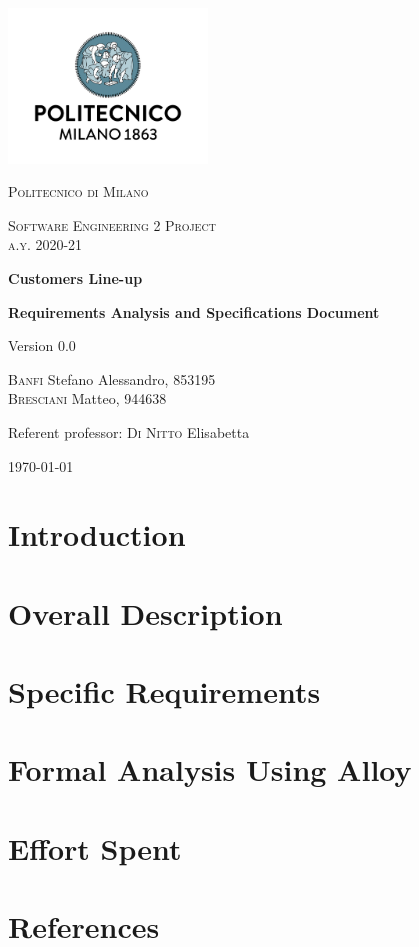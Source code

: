 \documentclass[fontsize=11pt,paper=a4,pagesize=auto]{report}
\begin{document}
\begin{titlepage}
	\centering
	\includegraphics[width=150pt]{images/polimi.jpg}\par\vspace{1cm}
	{\scshape\LARGE
		Politecnico di Milano\par}
	\vspace{1cm}
	{\scshape\Large
		Software Engineering 2 Project\\
		a.y. 2020-21\par}
	\vspace{1.5cm}
	{\huge\bfseries
		Customers Line-up\\\par}
	{\Large\bfseries
		Requirements Analysis and Specifications Document\par}
	Version 0.0\par
	\vspace{2cm}
	{\Large
		{\scshape Banfi}  Stefano Alessandro, 853195\\
		{\scshape Bresciani} Matteo, 944638\par}
	\vfill
	Referent professor: {\scshape Di Nitto} Elisabetta\par
	\vfill
	{\large\today\par}
\end{titlepage}



\tableofcontents
\chapter{Introduction}



\chapter{Overall Description}



\chapter{Specific Requirements}





\chapter{Formal Analysis Using Alloy}

\chapter{Effort Spent}
\chapter{References}
\end{document}
